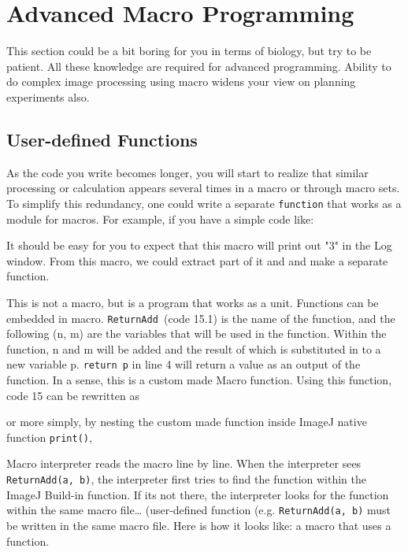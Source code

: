 \documentclass[11pt,a4paper,oneside]{report}
\newcommand{\ilcom}[1]{\texttt{\small#1}}
\begin{document}
\newpage

\section{Advanced Macro Programming}
This section could be a bit boring for you in terms of biology, but try to be patient. 
All these knowledge are required for advanced programming. 
Ability to do complex image processing using macro widens your view on planning experiments also.

\subsection{User-defined Functions}
As the code you write becomes longer, 
you will start to realize that similar processing or 
calculation appears several times in a macro or through macro sets. 
To simplify this redundancy, one could write a 
separate \ilcom{function} that works as a module for macros. 
For example, if you have a simple code like:

It should be easy for you to expect that this macro will print out "3" in the Log window. 
From this macro, we could extract part of it and and make a separate function. 

This is not a macro, but is a program that works as a unit. 
Functions can be embedded in macro. \ilcom{ReturnAdd }(code 15.1) is the name of the function, 
and the following (n, m) are the variables that will be used in the function. Within the function, 
n and m will be added and the result of which is substituted in to a new variable p. 
\ilcom{return p} in line 4 will return a value as an output of the function. 
In a sense, this is a custom made Macro function. Using this function, code 15 can be rewritten as

or more simply, by nesting the custom made function inside ImageJ native function \ilcom{print()},

Macro interpreter reads the macro line by line. When the interpreter sees \ilcom{ReturnAdd(a, b)}, 
the interpreter first tries to find the function within the ImageJ Build-in function. 
If its not there, the interpreter looks for the function within the same macro file\ldots 
(user-defined function (e.g. \ilcom{ReturnAdd(a, b)} must be written in the same macro file. 
Here is how it looks like: a macro that uses a function. 
\end{document}
